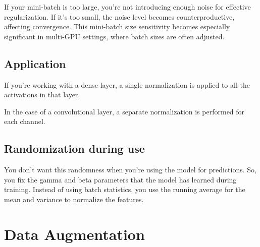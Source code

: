 \documentclass[11pt]{article}
\begin{document}
If your mini-batch is too large, you're not introducing enough noise for effective regularization. If it's too small, the noise level becomes counterproductive, affecting convergence. This mini-batch size sensitivity becomes especially significant in multi-GPU settings, where batch sizes are often adjusted.

\subsection{Application}

If you're working with a dense layer, a single normalization is applied to all the activations in that layer.

In the case of a convolutional layer, a separate normalization is performed for each channel.

\subsection{Randomization during use}

You don't want this randomness when you're using the model for predictions. So, you fix the gamma and beta parameters that the model has learned during training. Instead of using batch statistics, you use the running average for the mean and variance to normalize the features.

\section{Data Augmentation}



\printbibliography
\end{document}
